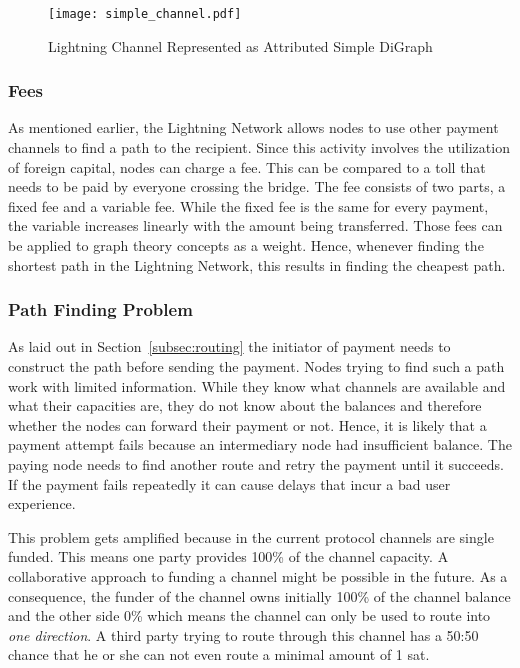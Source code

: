 \documentclass[final]{fhnwreport}       %
\begin{document}
\begin{figure}[H]
\centering
\texttt{[image: simple\_channel.pdf]}
\caption{Lightning Channel Represented as Attributed Simple DiGraph}
\label{fig:channel_graph}
\end{figure}

\subsubsection{Fees}
As mentioned earlier, the Lightning Network allows nodes to use other payment channels to find a path to the recipient. Since this activity involves the utilization of foreign capital, nodes can charge a fee. This can be compared to a toll that needs to be paid by everyone crossing the bridge. The fee consists of two parts, a fixed fee and a variable fee. While the fixed fee is the same for every payment, the variable increases linearly with the amount being transferred. Those fees can be applied to graph theory concepts as a weight. Hence, whenever finding the shortest path in the Lightning Network, this results in finding the cheapest path.

\subsubsection{Path Finding Problem}\label{subsubsec:pproblem}
As laid out in Section~\ref{subsec:routing} the initiator of payment needs to construct the path before sending the payment. Nodes trying to find such a path work with limited information. While they know what channels are available and what their capacities are, they do not know about the balances and therefore whether the nodes can forward their payment or not. Hence, it is likely that a payment attempt fails because an intermediary node had insufficient balance. The paying node needs to find another route and retry the payment until it succeeds. If the payment fails repeatedly it can cause delays that incur a bad user experience.

This problem gets amplified because in the current protocol channels are single funded. This means one party provides 100\% of the channel capacity. A collaborative approach to funding a channel might be possible in the future. As a consequence, the funder of the channel owns initially 100\% of the channel balance and the other side 0\% which means the channel can only be used to route into \emph{one direction}. A third party trying to route through this channel has a 50:50 chance that he or she can not even route a minimal amount of 1 sat. 
\end{document}
